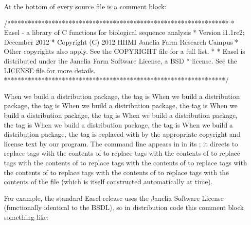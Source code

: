 At the bottom of every source file is a comment block:

\begin{cchunk}
/*****************************************************************
 * Easel - a library of C functions for biological sequence analysis
 * Version i1.1rc2; December 2012
 * Copyright (C) 2012 HHMI Janelia Farm Research Campus
 * Other copyrights also apply. See the COPYRIGHT file for a full list.
 * 
 * Easel is distributed under the Janelia Farm Software License, a BSD
 * license. See the LICENSE file for more details.
 *****************************************************************/
\end{cchunk}

When we build a distribution package, the  tag is
When we build a distribution package, the  tag is
When we build a distribution package, the  tag is
When we build a distribution package, the  tag is
When we build a distribution package, the \ccode{} tag is
When we build a distribution package, the  tag is
When we build a distribution package, the  tag is
replaced with by the appropriate copyright and license text by our
 program. The command line appears in
 in its ; it directs
 to replace  tags with the contents of
 to replace  tags with the contents of
 to replace  tags with the contents of
 to replace  tags with the contents of
 to replace \ccode{} tags with the contents of
 to replace  tags with the contents of
 to replace  tags with the contents of
the  file (which is itself constructed
automatically at  time).

For example, the standard Easel release uses the Janelia Software
License (functionally identical to the BSDL), so in distribution code
this comment block something like:

